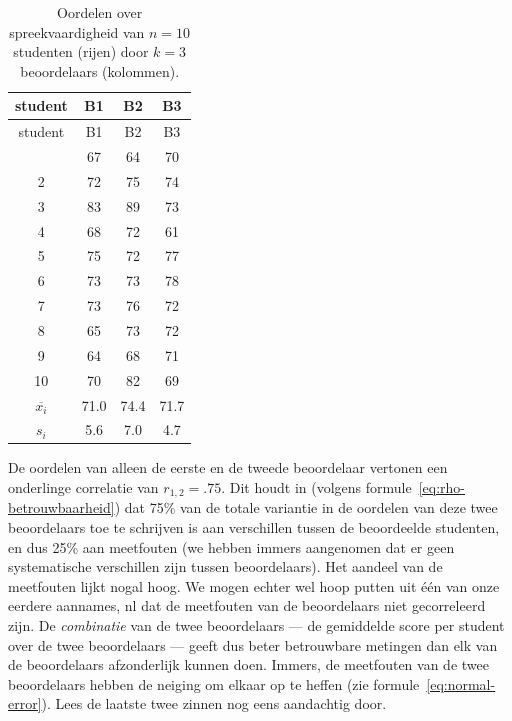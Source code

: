 \documentclass[
]{book}
\begin{document}
\begin{longtable}[]{@{}cccc@{}}
\caption{\label{tab:betrouwbaarheid} Oordelen over spreekvaardigheid van \(n = 10\) studenten (rijen) door
\(k = 3\) beoordelaars (kolommen).}\tabularnewline
\toprule\noalign{}
student & B1 & B2 & B3 \\
\midrule\noalign{}
\endfirsthead
\toprule\noalign{}
student & B1 & B2 & B3 \\
\midrule\noalign{}
\endhead
\bottomrule\noalign{}
\endlastfoot
1 & 67 & 64 & 70 \\
2 & 72 & 75 & 74 \\
3 & 83 & 89 & 73 \\
4 & 68 & 72 & 61 \\
5 & 75 & 72 & 77 \\
6 & 73 & 73 & 78 \\
7 & 73 & 76 & 72 \\
8 & 65 & 73 & 72 \\
9 & 64 & 68 & 71 \\
10 & 70 & 82 & 69 \\
\(\overline{x_i}\) & 71.0 & 74.4 & 71.7 \\
\(s_i\) & 5.6 & 7.0 & 4.7 \\
\end{longtable}

De oordelen van alleen de eerste en de tweede beoordelaar vertonen een
onderlinge correlatie van \(r_{1,2}=.75\). Dit houdt in (volgens
formule~\eqref{eq:rho-betrouwbaarheid}) dat 75\% van de totale variantie in
de oordelen van deze twee beoordelaars toe te schrijven is aan
verschillen tussen de beoordeelde studenten, en dus 25\% aan meetfouten
(we hebben immers aangenomen dat er geen systematische verschillen zijn
tussen beoordelaars). Het aandeel van de meetfouten lijkt nogal hoog. We
mogen echter wel hoop putten uit één van onze eerdere aannames, nl dat
de meetfouten van de beoordelaars niet gecorreleerd zijn. De
\emph{combinatie} van de twee beoordelaars --- de gemiddelde score per
student over de twee beoordelaars --- geeft dus beter betrouwbare
metingen dan elk van de beoordelaars afzonderlijk kunnen doen. Immers,
de meetfouten van de twee beoordelaars hebben de neiging om elkaar op te
heffen (zie formule~\eqref{eq:normal-error}).
Lees de laatste twee zinnen nog eens aandachtig door.
\end{document}
